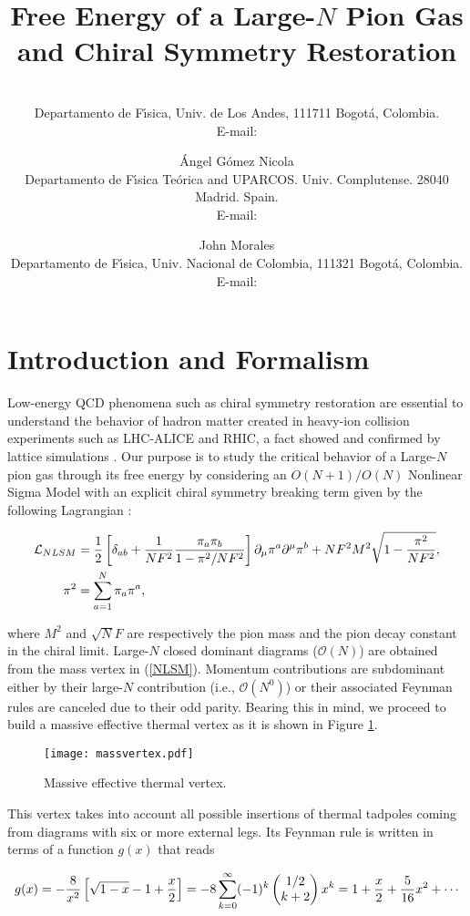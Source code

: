 \documentclass{PoS}
\title{Free Energy of a Large-$N$ Pion Gas and Chiral Symmetry Restoration}
\author{\speaker{Santiago Cort\'es} \\
        Departamento de F\'{\i}sica, Univ. de Los  Andes, 111711 Bogot\'a, Colombia.\\
        E-mail: \email{js.cortes125@uniandes.edu.co}}
\author{\'Angel G\'omez Nicola\\
        Departamento de F\'{\i}sica Te\'orica and UPARCOS. Univ. Complutense. 28040 Madrid. Spain. \\
        E-mail: \email{gomez@ucm.es}}
\author{John Morales\\
        Departamento de F\'{\i}sica, Univ. Nacional de Colombia, 111321 Bogot\'a, Colombia.\\
        E-mail: \email{jmoralesa@unal.edu.co}}
\begin{document}
\section{Introduction and Formalism}

Low-energy QCD phenomena such as chiral symmetry restoration are essential to understand the behavior of hadron matter created in heavy-ion collision experiments such as LHC-ALICE and RHIC, a fact showed and confirmed by lattice simulations \cite{Aoki:2009sc}. Our purpose is to study the critical behavior of a Large-$N$ pion gas through its free energy by considering an $O(N+1)/O(N)$ Nonlinear Sigma Model with an explicit chiral symmetry breaking term given by the following Lagrangian \cite{Dobado:1994fd,dobadobook}:  


\begin{align}
\mathcal{L}_{NLSM}&=\frac{1}{2}\left[\delta_{ab}+\frac{1}{NF^{2}}\frac{\pi_{a}\pi_{b}}{1-\pi^2/NF^{2}}\right]\partial_{\mu}\pi^{a}\partial^{\mu}\pi^{b}+NF^2M^2\sqrt{1-\frac{\pi^2}{NF^2}}, \label{NLSM} \\
\pi^2&=\displaystyle\sum_{a=1}^{N}\pi_{a}\pi^{a}, \notag
\end{align}

\noindent where $M^2$ and $\sqrt{N}F$ are respectively the pion mass and  the pion decay constant in the chiral limit. Large-$N$ closed dominant diagrams ($\mathcal{O}(N)$) are obtained from the mass vertex in (\ref{NLSM}). Momentum contributions are subdominant either by their large-$N$ contribution (i.e., $\mathcal{O}(N^{0})$) or their associated Feynman rules are canceled due to their odd parity. Bearing this in mind, we proceed to build a massive effective thermal vertex as it is shown in Figure \ref{fig:massvertex}.    


\begin{figure}
\centering
\texttt{[image: massvertex.pdf]}
\caption{Massive effective thermal vertex.}
\label{fig:massvertex}
\end{figure}


This vertex takes into account all possible insertions of thermal tadpoles coming from diagrams with six or more external legs. Its Feynman rule is written in terms of a function $g(x)$ that reads


\begin{equation}
g(x)=-\frac{8}{x^2}\left[\sqrt{1-x}-1+\frac{x}{2}\right]=-8\sum_{k=0}^{\infty}(-1)^k \begin{pmatrix} 1/2\cr k+2 \end{pmatrix} x^k=1+\frac{x}{2}+\frac{5}{16}x^2+\cdots
\label{eqn:massvert}
\end{equation}
\end{document}
